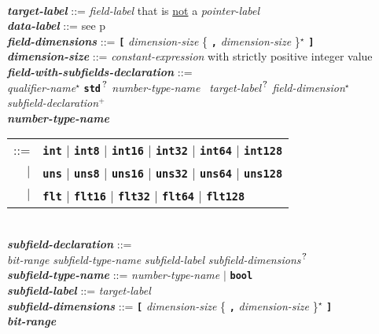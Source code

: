 \documentclass[12pt]{article}
\newcommand{\TT}[1]{{\tt \bfseries #1}}
\newcommand{\STAR}{{\Large $^\star$}}
\newcommand{\PLUS}[1][]{{$^{+#1}$}}
\newcommand{\QMARK}{{$^{\,\mbox{\footnotesize ?}}$}}
\newcommand{\ttkey}[1]{{\tt \bfseries #1}}
\newcommand{\emkey}[1]{{\em \bfseries #1}}
\newcommand{\pagref}[1]{p\pageref{#1}}
\newenvironment{indpar}[1][0.3in]%
	{\begin{list}{}%
		     {\setlength{\itemsep}{0in}%
		      \setlength{\topsep}{0in}%
		      \setlength{\parsep}{1ex}%
		      \setlength{\labelwidth}{#1}%
		      \setlength{\leftmargin}{#1}%
		      \addtolength{\leftmargin}{\labelsep}}%
	 \item}%
	{\end{list}}
\begin{document}
\begin{indpar}
\begin{tabular}[t]{@{}l}
    \end{tabular} \\
\emkey{target-label}\label{TARGET-LABEL} ::=
    {\em field-label} that is \underline{not} a {\em pointer-label} \\
\emkey{data-label} ::=  see \pagref{DATA-LABEL}
\\[2ex]
\emkey{field-dimensions} ::=
    \TT{[} {\em dimension-size} \{ \TT{,} {\em dimension-size} \}\STAR{}
    \TT{]} \\
\emkey{dimension-size} ::=  {\em constant-expression}
			    with strictly positive integer value
\\[2ex]
\emkey{field-with-subfields-declaration} ::= \\
\hspace*{0.5in}
    {\em qualifier-name}\STAR{}
    \TT{std}\QMARK{} {\em number-type-name}~ {\em target-label}\QMARK{}
                {\em field-dimension}\STAR{} \\
\hspace*{0.5in}
    {\em subfield-declaration}\PLUS{}
\\[2ex]
\emkey{number-type-name}
    \begin{tabular}[t]{@{}rl}
    ::= &  \ttkey{int} $|$ \ttkey{int8} $|$ \ttkey{int16} $|$ \ttkey{int32}
                       $|$ \ttkey{int64} $|$ \ttkey{int128} \\
    $|$ &  \ttkey{uns} $|$ \ttkey{uns8} $|$ \ttkey{uns16} $|$ \ttkey{uns32}
                       $|$ \ttkey{uns64} $|$ \ttkey{uns128} \\
    $|$ &  \ttkey{flt} $|$ \ttkey{flt16} $|$ \ttkey{flt32} $|$ \ttkey{flt64}
                         $|$ \ttkey{flt128} \\
    \end{tabular}
\\[2ex]
\emkey{subfield-declaration}\label{SUBFIELD-DECLARATION} ::= \\
\hspace*{0.5in}
    {\em bit-range} {\em subfield-type-name} {\em subfield-label}
    		{\em subfield-dimensions}\QMARK{} \\
\emkey{subfield-type-name}\label{SUBFIELD-TYPE-NAME} ::=
    {\em number-type-name} $|$ \TT{bool} \\
\emkey{subfield-label}\label{SUBFIELD-LABEL} ::=  {\em target-label} \\
\emkey{subfield-dimensions} ::=
    \TT{[} {\em dimension-size} \{ \TT{,} {\em dimension-size} \}\STAR{} \TT{]}
\\[2ex]
\emkey{bit-range}
    \begin{tabular}[t]{@{}rl}

\end{tabular}
\end{indpar}
\end{document}
